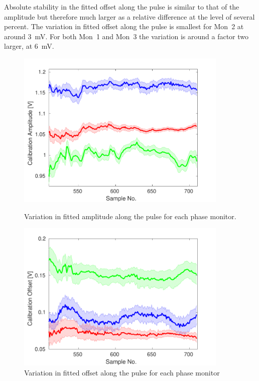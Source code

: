Absolute stability in the fitted offset along the pulse is similar to that of the amplitude but therefore much larger as a relative difference at the level of several percent. The variation in fitted offset along the pulse is smallest for Mon~2 at around 3~mV. For both Mon~1 and Mon~3 the variation is around a factor two larger, at 6~mV.

\begin{figure}
  \centering
  \includegraphics[width=0.9\textwidth]{Figures/phaseMons/calAmpVsSample}
  \caption{Variation in fitted amplitude along the pulse for each phase monitor.}
  \label{f:calAmpVsSample}
  \centering
  \includegraphics[width=0.9\textwidth]{Figures/phaseMons/calOffVsSample}
  \caption{Variation in fitted offset along the pulse for each phase monitor}
  \label{f:calOffVsSample}
\end{figure}

